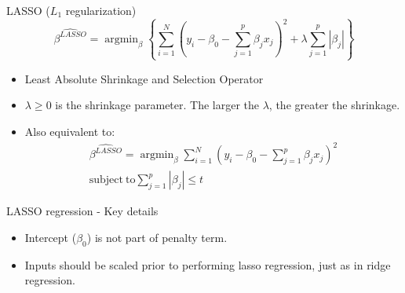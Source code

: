 \documentclass[aspectratio=169]{beamer}
\DeclareMathOperator*{\argmin}{argmin}
\begin{document}
\begin{frame}{LASSO ($L_1$ regularization)}
    \begin{equation*}
        \hat{\beta^{LASSO}} = \argmin_\beta \left \{ \sum_{i=1}^N (y_i - \beta_0 - \sum_{j=1}^p \beta_j x_j)^2 + \lambda \sum_{j=1}^p |\beta_j| \right \}
    \end{equation*}
    \begin{itemize}
        \item Least Absolute Shrinkage and Selection Operator
        \item $\lambda \geq 0$ is the shrinkage parameter. The larger the $\lambda$, the greater the shrinkage.
        \item Also equivalent to:
        \begin{eqnarray*}
        \hat{\beta^{LASSO}} = \argmin_\beta \sum_{i=1}^N (y_i - \beta_0 - \sum_{j=1}^p \beta_j x_j)^2\\
        \mathrm{subject~to} \sum_{j=1}^p |\beta_j| \leq t
        \end{eqnarray*}
    \end{itemize}
\end{frame}


\begin{frame}{LASSO regression - Key details}
    \begin{itemize}
        \item Intercept ($\beta_0$) is not part of penalty term.
        \item Inputs should be scaled prior to performing lasso regression, just as in ridge regression.
    \end{itemize}
\end{frame} 
\end{document}
